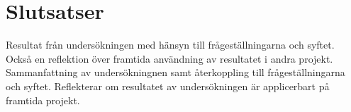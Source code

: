 \section{Slutsatser}
\label{sec:bjorn-conclusion}

Resultat från undersökningen med hänsyn till frågeställningarna och syftet. Också en reflektion över framtida användning av resultatet i andra projekt.
Sammanfattning av undersökningnen samt återkoppling till frågeställningarna och syftet. Reflekterar om resultatet av undersökningen är applicerbart på framtida projekt.
